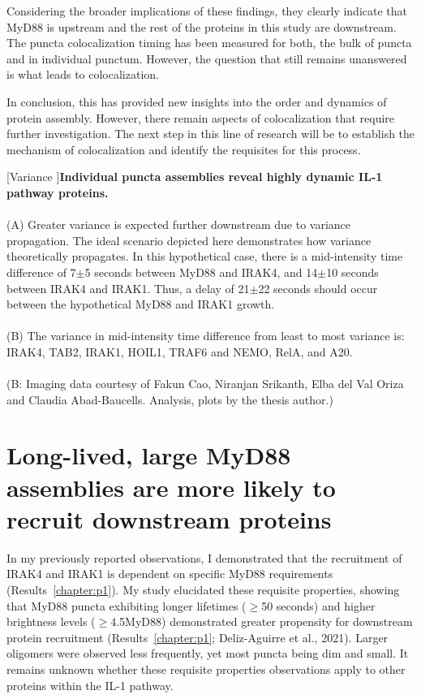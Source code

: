 Considering the broader implications of these findings, they clearly indicate that MyD88 is upstream and the rest of the proteins in this study are downstream. The puncta colocalization timing has been measured for both, the bulk of puncta and in individual punctum. However, the question that still remains unanswered is what leads to colocalization.

In conclusion, this has provided new insights into the order and dynamics of protein assembly. However, there remain aspects of colocalization that require further investigation. The next step in this line of research will be to establish the mechanism of colocalization and identify the requisites for this process.


\begin{centering}
\captionsetup{parbox=none}
[Variance ]{\textbf{Individual puncta assemblies reveal highly dynamic IL-1 pathway proteins.}
\\
\\
(A) Greater variance is expected further downstream due to variance propagation. The ideal scenario depicted here demonstrates how variance theoretically propagates. In this hypothetical case, there is a mid-intensity time difference of 7$\pm$5 seconds between MyD88 and IRAK4, and 14$\pm$10 seconds between IRAK4 and IRAK1. Thus, a delay of 21$\pm$22 seconds should occur between the hypothetical MyD88 and IRAK1 growth.
\\
\\
(B) The variance in mid-intensity time difference from least to most variance is: IRAK4, TAB2, IRAK1, HOIL1, TRAF6 and NEMO, RelA, and A20.
\\
\\
(B: Imaging data courtesy of Fakun Cao, Niranjan Srikanth, Elba del Val Oriza and Claudia Abad-Baucells. Analysis, plots by the thesis author.)}
\label{p2:D2}
\end{centering}

\section{Long-lived, large MyD88 assemblies are more likely to recruit downstream proteins}
In my previously reported observations, I demonstrated that the recruitment of IRAK4 and IRAK1 is dependent on specific MyD88 requirements (Results~\ref{chapter:p1}). My study elucidated these requisite properties, showing that MyD88 puncta exhibiting longer lifetimes ($\geq$50 seconds) and higher brightness levels ($\geq$4.5\times MyD88) demonstrated greater propensity for downstream protein recruitment (Results~\ref{chapter:p1}; Deliz-Aguirre et al., 2021). Larger oligomers were observed less frequently, yet most puncta being dim and small. It remains unknown whether these requisite properties observations apply to other proteins within the IL-1 pathway.


